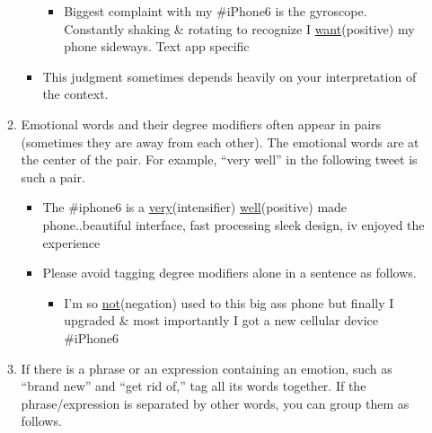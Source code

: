\documentclass[english]{jnlp_1.4}
\begin{document}
\begin{enumerate}
\begin{enumerate}
\begin{itemize}
				  \begin{itemize}
				  	\item[\XBox] {\sf Biggest complaint with my \#iPhone6 is the gyroscope. Constantly shaking \& rotating to recognize I \underline{want}{\boldsf (positive)} my phone sideways. Text app specific}
				  \end{itemize}
			\item This judgment sometimes depends heavily on your interpretation of the context. 
		\end{itemize}
		\item Emotional words and their degree modifiers often appear in pairs (sometimes they are away from each other). The emotional words are at the center of the pair. For example, ``very well'' in the following tweet is such a pair.
			
			\begin{itemize}
				\item[\CheckedBox] {\sf The \#iphone6 is a \underline{very}{\boldsf (intensifier)} \underline{well}{\boldsf (positive)} made phone..beautiful interface, fast processing sleek design, iv enjoyed the experience}
			\end{itemize}
		\begin{itemize}
			\item Please avoid tagging degree modifiers alone in a sentence as follows.
				
				\begin{itemize}
					\item[\XBox] {\sf I'm so \underline{not}{\boldsf (negation)} used to this big ass phone but finally I upgraded \& most importantly I got a new cellular device \#iPhone6}
				\end{itemize}
		\end{itemize}
		\item If there is a phrase or an expression containing an emotion, such as ``brand new'' and ``get rid of,'' tag all its words together. If the phrase/expression is separated by other words, you can group them as follows. 
			

\end{enumerate}
\end{enumerate}
\end{document}
